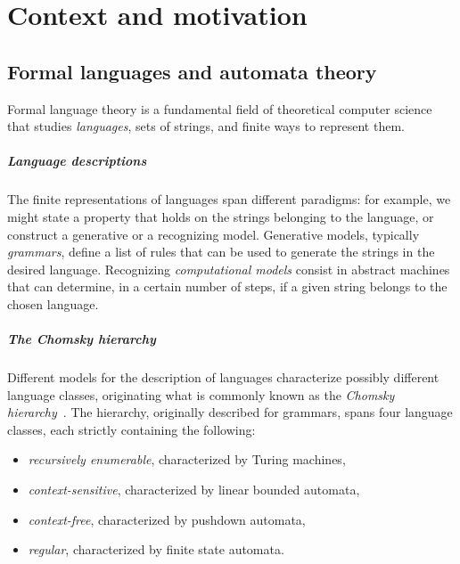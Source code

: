 \chapter{Context and motivation}\label{ch:context}



\section{Formal languages and automata theory}
Formal language theory is a fundamental field of theoretical computer science that studies \emph{languages}, \ie sets of strings, and finite ways to represent them.

\paragraph{Language descriptions} The finite representations of languages span different paradigms: for example, we might state a property that holds on the strings belonging to the language, or construct a generative or a recognizing model.
Generative models, typically \emph{grammars}, define a list of rules that can be used to generate the strings in the desired language.
Recognizing \emph{computational models} consist in abstract machines that can determine, in a certain number of steps, if a given string belongs to the chosen language.

\paragraph{The Chomsky hierarchy} Different models for the description of languages characterize possibly different language classes, originating what is commonly known as the \emph{Chomsky hierarchy}~\cite{Cho56}.
The hierarchy, originally described for grammars, spans four language classes, each strictly containing the following:
\begin{itemize}
	\item \emph{recursively enumerable}, characterized by Turing machines,
	\item \emph{context-sensitive}, characterized by linear bounded automata,
	\item \emph{context-free}, characterized by pushdown automata,
	\item \emph{regular}, characterized by finite state automata.
\end{itemize}

